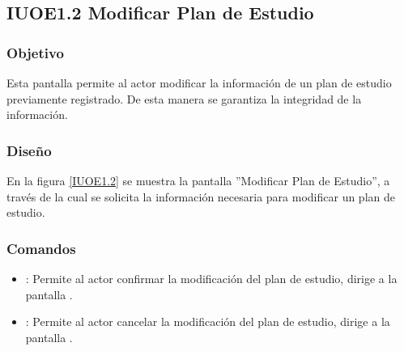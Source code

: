 \subsection{IUOE1.2 Modificar Plan de Estudio}

\subsubsection{Objetivo}
	Esta pantalla permite al actor modificar la información de un plan de estudio previamente registrado. De esta manera se garantiza la integridad de la información.

\subsubsection{Diseño}
	En la figura \ref{IUOE1.2} se muestra la pantalla ''Modificar Plan de Estudio'', a través de la cual se solicita la información necesaria para modificar un plan de estudio.


\subsubsection{Comandos}
\begin{itemize}
	\item {}: Permite al actor confirmar la modificación del plan de estudio, dirige a la pantalla .
	
	\item {}: Permite al actor cancelar la modificación del plan de estudio, dirige a la pantalla .
\end{itemize}
